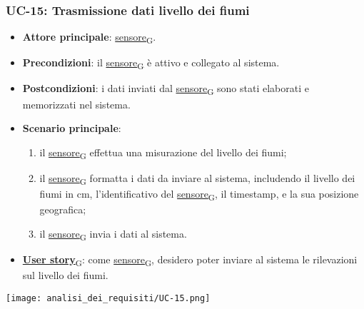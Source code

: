 \subsubsection{UC-15: Trasmissione dati livello dei fiumi}
\begin{itemize}
	\item \textbf{Attore principale}: \href{https://7last.github.io/docs/pb/documentazione-interna/glossario\#sensore}{sensore\textsubscript{G}}.
	\item \textbf{Precondizioni}: il \href{https://7last.github.io/docs/pb/documentazione-interna/glossario\#sensore}{sensore\textsubscript{G}} è attivo e collegato al sistema.
	\item \textbf{Postcondizioni}: i dati inviati dal \href{https://7last.github.io/docs/pb/documentazione-interna/glossario\#sensore}{sensore\textsubscript{G}} sono stati elaborati e memorizzati nel sistema.
	\item \textbf{Scenario principale}:
	      \begin{enumerate}
		      \item il \href{https://7last.github.io/docs/pb/documentazione-interna/glossario\#sensore}{sensore\textsubscript{G}} effettua una misurazione del livello dei fiumi;
		      \item il \href{https://7last.github.io/docs/pb/documentazione-interna/glossario\#sensore}{sensore\textsubscript{G}} formatta i dati da inviare al sistema, includendo il livello dei fiumi in cm, l'identificativo del \href{https://7last.github.io/docs/pb/documentazione-interna/glossario\#sensore}{sensore\textsubscript{G}},
		            il timestamp, e la sua posizione geografica;
		      \item il \href{https://7last.github.io/docs/pb/documentazione-interna/glossario\#sensore}{sensore\textsubscript{G}} invia i dati al sistema.
	      \end{enumerate}
	\item \href{https://7last.github.io/docs/pb/documentazione-interna/glossario\#user-story}{\textbf{User story}\textsubscript{G}}: come \href{https://7last.github.io/docs/pb/documentazione-interna/glossario\#sensore}{sensore\textsubscript{G}}, desidero poter inviare al sistema le rilevazioni sul livello dei fiumi.
\end{itemize}

\begin{center}
	\texttt{[image: analisi\_dei\_requisiti/UC-15.png]}
\end{center}

